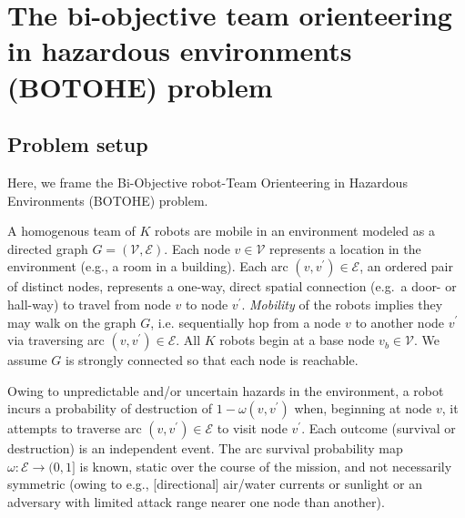 \documentclass[fleqn,10pt,lineno]{wlpeerj}
\begin{document}
\section{The bi-objective team orienteering in hazardous environments (BOTOHE) problem}



\subsection{Problem setup}
Here, we frame the Bi-Objective robot-Team Orienteering in Hazardous Environments (BOTOHE) problem. 

A homogenous team of $K$ robots are mobile in an environment modeled as a directed graph $G=(\mathcal{V}, \mathcal{E})$. Each node $v \in \mathcal{V}$ represents a location in the environment (e.g., a room in a building). Each arc $(v, v^\prime) \in\mathcal{E}$, an ordered pair of distinct nodes, represents a one-way, direct spatial connection (e.g.\ a door- or hall-way) to travel from node $v$ to node $v^\prime$. 
\emph{Mobility} of the robots implies they may walk on the graph $G$, i.e. sequentially hop from a node $v$ to another node $v^\prime$ via traversing arc $(v, v^\prime)\in\mathcal{E}$.
All $K$ robots begin at a base node $v_b \in \mathcal{V}$. 
We assume $G$ is strongly connected so that each node is reachable.

Owing to unpredictable and/or uncertain hazards in the environment, a robot incurs a probability of destruction of $1 - \omega(v, v^\prime)$ when, beginning at node $v$, it attempts to traverse arc $(v, v^\prime) \in \mathcal{E}$ to visit node $v^\prime$.
Each outcome (survival or destruction) is an independent event. 
The arc survival probability map $\omega: \mathcal{E} \rightarrow (0, 1]$ is known, static over the course of the mission, and not necessarily symmetric (owing to e.g., [directional] air/water currents or sunlight or an adversary with limited attack range nearer one node than another).
\end{document}
